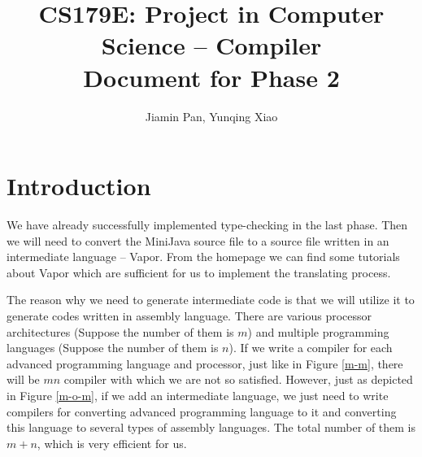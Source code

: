\documentclass[letterpaper, 14pt]{article}
\begin{document}
\title{CS179E: Project in Computer Science -- Compiler\\ Document for Phase 2}
\author{Jiamin Pan, Yunqing Xiao}
\date{}
\maketitle

\section{Introduction}

We have already successfully implemented type-checking in the last phase. Then we will need to convert the MiniJava source file to a source file written in an intermediate language -- Vapor. From the homepage \cite{homepage} we can find some tutorials about Vapor which are sufficient for us to implement the translating process. 

The reason why we need to generate intermediate code is that we will utilize it to generate codes written in assembly language. There are various processor architectures (Suppose the number of them is $m$) and multiple programming languages (Suppose the number of them is $n$). If we write a compiler for each advanced programming language and processor, just like in Figure \ref{m-m}, there will be $mn$ compiler with which we are not so satisfied. However, just as depicted in Figure \ref{m-o-m}, if we add an intermediate language, we just need to write compilers for converting advanced programming language to it and converting this language to several types of assembly languages. The total number of them is $m+n$, which is very efficient for us. 
\end{document}
